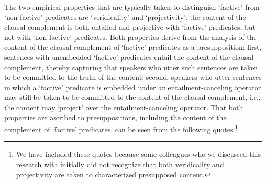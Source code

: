 \documentclass[11pt,fleqn]{article}
\newcommand{\6}{\mbox{$[\hspace*{-.6mm}[$}}
\newcommand{\9}{\mbox{$]\hspace*{-.6mm}]$}}
\begin{document}
The two empirical properties that are typically taken to distinguish `factive' from `non-factive' predicates are `veridicality' and `projectivity': the content of the clausal complement is both entailed and projective with `factive' predicates, but not with `non-factive' predicates. Both properties derive  from the analysis of the content of the clausal complement of `factive' predicates as a presupposition: first, sentences with unembedded `factive' predicates entail the content of the clausal complement, thereby capturing that speakers who utter such sentences are taken to be committed to the truth of the content; second, speakers who utter sentences in which a `factive' predicate is embedded under an entailment-canceling operator may still be taken to be committed to the content of the clausal complement, i.e., the content may `project' over the entailment-canceling operator. That both properties are ascribed to presuppositions, including the content of the complement of `factive' predicates, can be seen from the following quotes:\footnote{We have included these quotes because some colleagues who we discussed this research with initially did not recognize that both veridicality and projectivity are taken to characterized presupposed content.}
\end{document}
